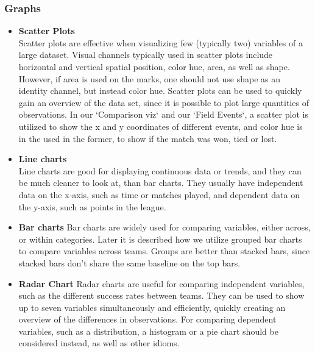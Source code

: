 \documentclass[Report.tex]{subfiles}
\begin{document}
\subsubsection{Graphs}
\begin{itemize}
  \item \textbf{Scatter Plots}
  \\Scatter plots are effective when visualizing few (typically two) variables
  of a large dataset\cite[Chapter 5, p. 54]{Iliinsky}. Visual channels typically used in
  scatter plots include horizontal and vertical spatial position, color hue, area, as well as shape. However,
  if area is used on the marks, one should not use shape as an identity channel,
  but instead color hue. 
  Scatter plots can be used to quickly gain an overview of the data set, since
  it is possible to plot large quantities of observations.
  In our `Comparison viz` and our `Field Events`, a scatter plot is utilized to
  show the x and y coordinates of different events, and color hue is in the used
  in the former, to show if the match was won, tied or lost.
  
  \item \textbf{Line charts}
  \\Line charts are good for displaying continuous data or trends, and they can
  be much cleaner to look at, than bar charts. They usually have independent
  data on the x-axis, such as time or matches played, and dependent data on the
  y-axis, such as points in the league.
  
  \item \textbf{Bar charts}
  Bar charts are widely used for comparing variables, either across, or within
  categories. Later it is described how we utilize grouped bar charts to compare
  variables across teams. Groups are better than stacked bars, since stacked
  bars don't share the same baseline on the top bars.
  
  \item \textbf{Radar Chart}
  Radar charts are useful for comparing independent variables, such as the
  different success rates between teams. They can be used to show up to seven
  variables simultaneously and efficiently, quickly creating an overview of the
  differences in observations. For comparing dependent variables, such as a
  distribution, a histogram or a pie chart should be considered instead, as well
  as other idioms.

\end{itemize}
\end{document}
